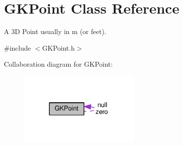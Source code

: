 \hypertarget{classGKPoint}{}\section{G\+K\+Point Class Reference}
\label{classGKPoint}


A 3D Point usually in m (or feet).  




{\ttfamily \#include $<$G\+K\+Point.\+h$>$}



Collaboration diagram for G\+K\+Point\+:\nopagebreak
\begin{figure}[H]
\begin{center}
\leavevmode
\includegraphics[width=170pt]{classGKPoint__coll__graph}
\end{center}
\end{figure}
